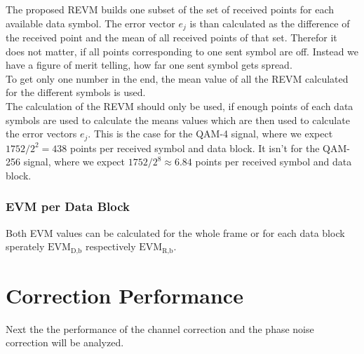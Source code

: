 The proposed \acrfull{REVM} builds one subset of the set of received points for
each available data symbol. The error vector $e_j$ is than calculated as the
difference of the received point and the mean of all received points of that
set. Therefor it does not matter, if all points corresponding to one sent symbol
are off. Instead we have a figure of merit telling, how far one sent symbol gets
spread. \\

To get only one number in the end, the mean value of all the \gls{REVM}
calculated for the different symbols is used. \\

The calculation of the \gls{REVM} should only be used, if enough points
of each data symbols are used to calculate the means values which are then
used to calculate the error vectors $e_j$. This is the case for the \gls{QAM}-4
signal, where we expect $1752 / 2^2 = 438$ points per received symbol and
data block.
It isn't for the \gls{QAM}-256 signal, where we expect $1752 / 2^8 \approx 6.84$
points per received symbol and data block.

\subsubsection{\gls{EVM} per Data Block}
Both \gls{EVM} values can be calculated for the whole frame or for each
data block sperately $\text{EVM}_\text{D,b}$ respectively
$\text{EVM}_\text{R,b}$.

\section{Correction Performance}
Next the the performance of the channel correction and the
phase noise correction will be analyzed. \\


